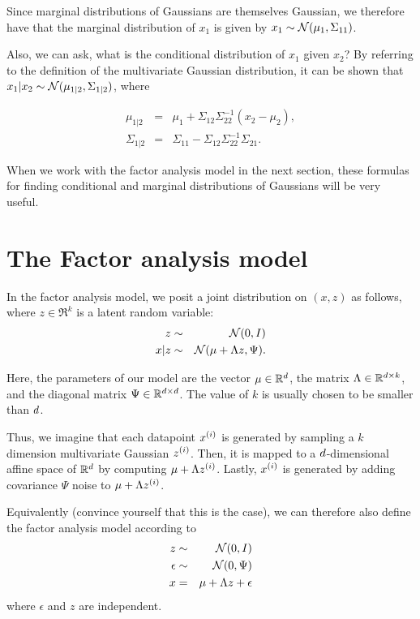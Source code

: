 \documentclass{article}
\begin{document}
Since marginal distributions of Gaussians are themselves Gaussian, we therefore have
that the marginal distribution of $x_1$ is given by $x_1 \sim {\cal N}(\mu_1, \Sigma_{11})$.

Also, we can ask, what is the conditional distribution of $x_1$ given $x_2$?
By referring to the definition of the multivariate Gaussian distribution, it
can be shown that $x_1 | x_2 \sim {\cal N}(\mu_{1|2}, \Sigma_{1|2})$, where

\begin{eqnarray}
\mu_{1|2} &=& \mu_1 + \Sigma_{12} \Sigma_{22}^{-1} (x_2 - \mu_2), \label{eqn-gausscond1} \\
\Sigma_{1|2} &=& \Sigma_{11} - \Sigma_{12}\Sigma_{22}^{-1}\Sigma_{21}.\label{eqn-gausscond2}
\end{eqnarray}

When we work with the factor analysis model in the next section, these formulas for
finding conditional and marginal distributions of Gaussians will be very useful.

\section{The Factor analysis model}

In the factor analysis model, we posit a joint distribution on $(x,z)$ as follows, where $z \in \Re^k$
is a latent random variable:
\begin{eqnarray*}
z &\sim& {\cal N}(0,I) \\
x|z &\sim& {\cal N}(\mu+\Lambda z, \Psi).
\end{eqnarray*}

Here, the parameters of our model are the vector $\mu \in {\mathbb R}^{d}$, the matrix
$\Lambda \in {\mathbb R}^{{d}\times k}$, and the diagonal matrix $\Psi \in {\mathbb R}^{{d}\times {d}}$.
The value of $k$ is usually chosen to be smaller than ${d}$.

Thus, we imagine that each datapoint ${x^{(i)}}$ is generated by sampling a $k$ dimension
multivariate Gaussian ${z^{(i)}}$.  Then, it is mapped to a ${d}$-dimensional affine space of
${\mathbb R}^{d}$ by computing $\mu+\Lambda {z^{(i)}}$.  Lastly, ${x^{(i)}}$ is generated by adding
covariance $\Psi$ noise to $\mu+\Lambda {z^{(i)}}$.

Equivalently (convince yourself that this is the case), we can therefore also define
the factor analysis model according to
\begin{eqnarray*}
z &\sim& {\cal N}(0,I) \\
\epsilon &\sim& {\cal N}(0, \Psi) \\
x &=& \mu+\Lambda z + \epsilon
\end{eqnarray*}
where $\epsilon$ and $z$ are independent.
\end{document}
